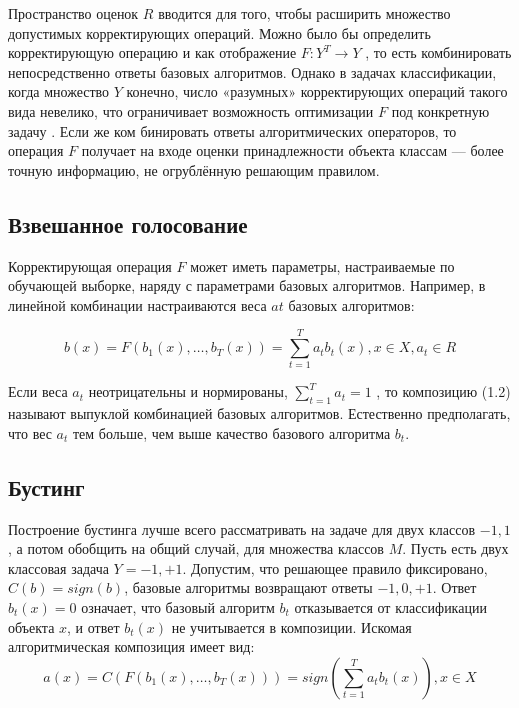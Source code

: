 Пространство оценок $R$ вводится для того, чтобы расширить множество допустимых корректирующих операций. Можно было бы определить корректирующую операцию и как отображение $F: Y^T \to Y$ , то есть комбинировать непосредственно ответы базовых алгоритмов. Однако в задачах классификации, когда множество $Y$ конечно, число «разумных» корректирующих операций такого вида невелико, что ограничивает возможность оптимизации $F$ под конкретную задачу \todobiography. Если же ком бинировать ответы алгоритмических операторов, то операция $F$ получает на входе оценки принадлежности объекта классам — более точную информацию, не огрублённую решающим правилом.

\subsection{Взвешанное голосование}

Корректирующая операция $F$ может иметь параметры, настраиваемые по обучающей выборке, наряду с параметрами базовых алгоритмов. Например, в линейной комбинации настраиваются веса $at$ базовых алгоритмов:

\begin{equation}
	b(x)=F(b_1(x), \dotsc ,b_T(x)) = \sum_{t=1}^{T} a_tb_t(x),  x \in X,  a_t \in R
\end{equation}

Если веса $a_t$ неотрицательны и нормированы, $\sum_{t=1}^{T} a_t =1$ , то композицию (1.2) называют выпуклой комбинацией базовых алгоритмов. Естественно предполагать, что вес $a_t$ тем больше, чем выше качество базового алгоритма $b_t$.

\subsection{Бустинг}

Построение бустинга лучше всего рассматривать на задаче для двух классов ${-1,1}$, а потом обобщить на общий случай, для множества классов $M$. Пусть есть двух классовая задача $Y={-1,+1}$. Допустим, что решающее правило фиксировано, $C(b) = sign(b)$, базовые алгоритмы возвращают ответы $-1,0,+1$. Ответ $b_t(x) = 0$ означает, что базовый алгоритм $b_t$ отказывается от классификации объекта $x$, и ответ $b_t(x)$ не учитывается в композиции.
Искомая алгоритмическая композиция имеет вид:
\begin{equation}
	a(x)=C(F(b_1(x),\dotsc,b_T(x)))=sign(\sum_{t=1}^{T} a_tb_t(x)), x \in X
\end{equation}


